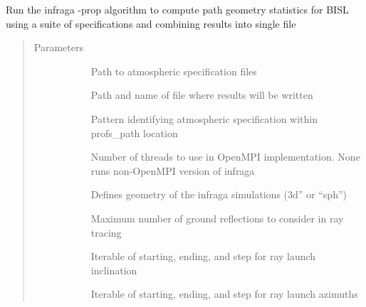 \documentclass[letterpaper,10pt,english]{sphinxmanual}
\begin{document}

\begin{fulllineitems}
\label{\detokenize{stochprop.propagation:stochprop.propagation.run_infraga}}
Run the infraga -prop algorithm to compute path geometry
statistics for BISL using a suite of specifications
and combining results into single file
\begin{quote}\begin{description}
\item[{Parameters}] \leavevmode\begin{description}
\item[{}] \leavevmode
Path to atmospheric specification files

\item[{}] \leavevmode
Path and name of file where results will be written

\item[{}] \leavevmode
Pattern identifying atmospheric specification within profs\_path location

\item[{}] \leavevmode
Number of threads to use in OpenMPI implementation.  None runs non-OpenMPI version of infraga

\item[{}] \leavevmode
Defines geometry of the infraga simulations (3d” or “sph”)

\item[{}] \leavevmode
Maximum number of ground reflections to consider in ray tracing

\item[{}] \leavevmode
Iterable of starting, ending, and step for ray launch inclination

\item[{}] \leavevmode
Iterable of starting, ending, and step for ray launch azimuths


\end{description}
\end{description}
\end{quote}
\end{fulllineitems}
\end{document}
